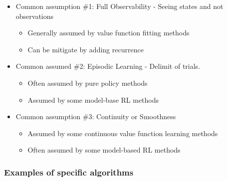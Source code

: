 \documentclass[]{article}
\begin{document}
\begin{itemize}
    \item Common assumption \#1: Full Observability -  Seeing states and not observations
        \begin{itemize}
            \item Generally assumed by value function fitting methods
            \item Can be mitigate by adding recurrence
        \end{itemize}
    \item Common assumed \#2: Episodic Learning - Delimit of trials. 
        \begin{itemize}
            \item Often assumed by pure policy methods
            \item Assumed by some model-base RL methods
        \end{itemize}
    \item Common assumption \#3: Continuity or Smoothness
        \begin{itemize}
            \item Assumed by some continuous value function learning methods
            \item Often assumed by some model-based RL methods
        \end{itemize}
\end{itemize}

\subsubsection*{Examples of specific algorithms}
\label{sub:Examples of specific algorithms}
\end{document}
